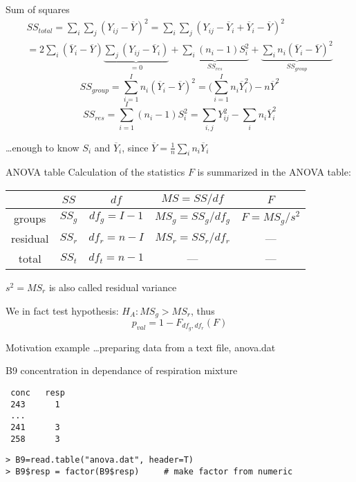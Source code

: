 \documentclass[smaller]{beamer}
\def\ol#1{\overline{#1}}
\def\blue#1{{\usebeamercolor[fg]{my blue} #1}}
\def\df#1{{\usebeamercolor[fg]{my orange} #1}}
\def\xskip{{\vspace{2ex}}}
\begin{document}
\begin{frame}{Sum of squares}
\begin{gather*}
  SS_{total}=\sum_i \sum_j (Y_{ij} - \ol{Y})^2 
  =\sum_i \sum_j (Y_{ij} - \ol{Y}_i + \ol{Y}_i - \ol{Y})^2 \\
  = 2\sum_i (\ol{Y}_i - \ol{Y}) \underbrace{\sum_j (Y_{ij} - \ol{Y}_i)}_{=0}
           +\underbrace{\sum_i (n_i-1)S_i^2}_{SS_{res}} + \underbrace{\sum_i n_i (\ol{Y}_i - \ol{Y})^2}_{SS_{group}}
\end{gather*}
\pause
\[
  SS_{group} = \sum_{i=1}^I n_i (\ol{Y}_i - \ol{Y})^2=\Big(\sum_{i=1}^I n_i \ol{Y}_i^2\Big) - n\ol{Y}^2
\]
\pause
\[
  SS_{res} = \sum_{i=1}^I (n_i - 1) S_i^2 = \sum_{i,j} Y_{ij}^2 - \sum_i n_i \ol{Y}_i^2
\]

\xskip
\dots enough to know $S_i$ and $\ol{Y}_i$, since $\ol{Y} = \frac{1}{n}\sum_i n_i \ol{Y}_i$
\end{frame}



\begin{frame}{ANOVA table}
Calculation of the statistics $F$ is summarized in the ANOVA table:

\xskip
\renewcommand*\arraystretch{1.5}
\begin{tabular}{c|c|c|c|c}
 & $SS$ & $df$ & $MS = SS/df$ & $F$ \\
\hline

groups & $SS_{g}$ & $df_g = I-1$ & $MS_g=SS_g / df_g$ & $F = MS_g/ s^2$\\
\hline
residual &$SS_{r}$ & $df_r = n-I$ & $MS_r=SS_r / df_r$ &  --- \\
\hline
total & $SS_t$ & $df_t = n-1$ & ---  & ---
\end{tabular}

\xskip
$s^2=MS_r$ is also called \df{residual variance}

\xskip
We in fact test hypothesis: $H_A: MS_g > MS_r$, thus
\[ p_{val} =1 - F_{df_g,df_r}(F) \]
\end{frame}

\begin{frame}[fragile]{Motivation example \dots preparing data}
\blue{from a text file}, anova.dat

\xskip
B9 concentration in dependance of respiration mixture
\begin{verbatim}
 conc   resp 
 243      1 
 ...
 241      3
 258      3 
\end{verbatim}
\begin{verbatim}
> B9=read.table("anova.dat", header=T)
> B9$resp = factor(B9$resp)     # make factor from numeric
\end{verbatim}
\end{frame}
\end{document}
